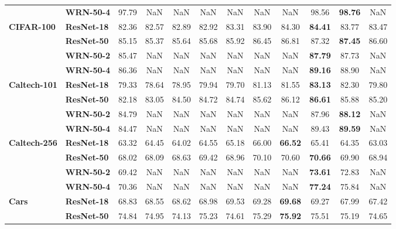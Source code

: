 \begin{table}
\begin{tabular}{l|l|cccccccccc}
       & \textbf{WRN-50-4} &             97.79 &   NaN &   NaN &   NaN &   NaN &   NaN &   NaN & 98.56 & \textbf{98.76} &   NaN \\
\cline{1-12}
\multirow{4}{*}{\textbf{CIFAR-100}} & \textbf{ResNet-18} &             82.36 & 82.57 & 82.89 & 82.92 & 83.31 & 83.90 & 84.30 & \textbf{84.41} & 83.77 & 83.47 \\
       & \textbf{ResNet-50} &             85.15 & 85.37 & 85.64 & 85.68 & 85.92 & 86.45 & 86.81 & 87.32 & \textbf{87.45} & 86.60 \\
       & \textbf{WRN-50-2} &             85.47 &   NaN &   NaN &   NaN &   NaN &   NaN &   NaN & \textbf{87.79} & 87.73 &   NaN \\
       & \textbf{WRN-50-4} &             86.36 &   NaN &   NaN &   NaN &   NaN &   NaN &   NaN & \textbf{89.16} & 88.90 &   NaN \\
\cline{1-12}
\multirow{4}{*}{\textbf{Caltech-101}} & \textbf{ResNet-18} &             79.33 & 78.64 & 78.95 & 79.94 & 79.70 & 81.13 & 81.55 & \textbf{83.13} & 82.30 & 79.80 \\
       & \textbf{ResNet-50} &             82.18 & 83.05 & 84.50 & 84.72 & 84.74 & 85.62 & 86.12 & \textbf{86.61} & 85.88 & 85.20 \\
       & \textbf{WRN-50-2} &             84.79 &   NaN &   NaN &   NaN &   NaN &   NaN &   NaN & 87.96 & \textbf{88.12} &   NaN \\
       & \textbf{WRN-50-4} &             84.47 &   NaN &   NaN &   NaN &   NaN &   NaN &   NaN & 89.43 & \textbf{89.59} &   NaN \\
\cline{1-12}
\multirow{4}{*}{\textbf{Caltech-256}} & \textbf{ResNet-18} &             63.32 & 64.45 & 64.02 & 64.55 & 65.18 & 66.00 & \textbf{66.52} & 65.41 & 64.35 & 63.03 \\
       & \textbf{ResNet-50} &             68.02 & 68.09 & 68.63 & 69.42 & 68.96 & 70.10 & 70.60 & \textbf{70.66} & 69.90 & 68.94 \\
       & \textbf{WRN-50-2} &             69.42 &   NaN &   NaN &   NaN &   NaN &   NaN &   NaN & \textbf{73.61} & 72.83 &   NaN \\
       & \textbf{WRN-50-4} &             70.36 &   NaN &   NaN &   NaN &   NaN &   NaN &   NaN & \textbf{77.24} & 75.84 &   NaN \\
\cline{1-12}
\multirow{4}{*}{\textbf{Cars}} & \textbf{ResNet-18} &             68.83 & 68.55 & 68.62 & 68.98 & 69.53 & 69.28 & \textbf{69.68} & 69.27 & 67.99 & 67.42 \\
       & \textbf{ResNet-50} &             74.84 & 74.95 & 74.13 & 75.23 & 74.61 & 75.29 & \textbf{75.92} & 75.51 & 75.19 & 74.65 \\

\end{tabular}
\end{table}
